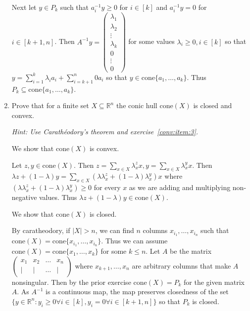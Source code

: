 \documentclass[11pt]{article}
\newcommand{\setR}{\mathbb{R}}
\renewcommand{\leq}{\leqslant}
\renewcommand{\geq}{\geqslant}
\newcommand{\cone}{\mathrm{cone}}
\begin{document}
\begin{enumerate}[1)]
\begin{solution}
  Next let $y \in P_k$ such that $a_i^{-1}y \geq 0$ for $i \in [k]$ and $a^{-1}_i y = 0$ for $i \in [k+1, n]$. Then $A^{-1}y = \begin{pmatrix} \lambda_1 \\ \lambda_2 \\ \vdots \\ \lambda_k \\ 0 \\ \vdots \\ 0\end{pmatrix}$ for some values $\lambda_i \geq 0, i \in [k]$ so that $y = \displaystyle\sum_{i =1}^k \lambda_i a_i + \displaystyle\sum_{i =k+1}^n 0 a_i$ so that $y \in \cone\{a_1, \hdots, a_k\}$. Thus $P_k \subseteq \cone\{a_1, \hdots, a_k\}$. 
  
  
  
  \end{solution}
  
  
  
  
\item Prove that for a finite set $X\subseteq\setR^n$ the conic hull $\cone(X)$ is closed
  and convex. \label{conv:item:2} 
  
  \emph{Hint: Use Carath\'eodory's theorem and exercise~\ref{conv:item:3}.}
  
  
  
  \begin{solution}
  We show that $\cone(X)$ is convex. 
  
  
  Let $z, y \in \cone(X)$. Then $z = \displaystyle\sum_{x \in X}\lambda_x^z x, y = \displaystyle\sum_{x \in X}\lambda_x^y x$. Then $\lambda z + (1-\lambda)y = \displaystyle\sum_{x \in X}(\lambda \lambda_x^z + (1-\lambda) \lambda_x^y) x$ where $(\lambda \lambda_x^z + (1-\lambda) \lambda_x^y) \geq 0$ for every $x$ as we are adding and multiplying non-negative values. Thus $\lambda z + (1-\lambda)y \in \cone(X)$. 
  
  
  We show that $\cone(X)$ is closed. 
  
  By caratheodory, if $|X| >n$, we can find $n$ columns $x_{i_1}, \hdots, x_{i_n}$ such that $\cone(X) = \cone\{x_{i_1}, \hdots, x_{i_n}\}$. Thus we can assume $\cone(X) = \cone\{x_{1}, \hdots, x_{k}\}$ for some $k \leq n$. Let $A$ be the matrix $\begin{pmatrix} x_1 & x_2 & \hdots &x_n \\|&|&\hdots&|\end{pmatrix}$ where $x_{k+1}, \hdots, x_n$ are arbitrary columns that make $A$ nonsingular. Then by the prior exercise $\cone(X) = P_k$ for the given matrix $A$. As $A^{-1}$ is a continuous map, the map preserves closedness of the set $\{ y \in \setR^n: y_i \geq 0 \forall i \in [k], y_i = 0 \forall i \in [k+1, n]\}$ so that $P_k$ is closed. 
  
  
  \end{solution}


\end{enumerate}



  
\end{document}
